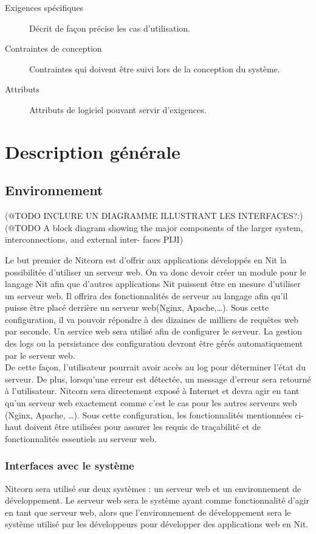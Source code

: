 \documentclass{scrreprt}
\begin{document}
\begin{description}
\item[Exigences spécifiques] Décrit de façon précise les cas d'utilisation.
\item[Contraintes de conception] Contraintes qui doivent être suivi lors de la conception du système.
\item[Attributs] Attributs de logiciel pouvant servir d'exigences. 
\end{description}
\chapter{Description générale}
\section{Environnement}
(@TODO INCLURE UN DIAGRAMME ILLUSTRANT LES INTERFACES?:)\\
(@TODO A block diagram showing the major components of the larger system, interconnections, and external inter-
faces PIJI)

Le but premier de Nitcorn est d'offrir aux applications développés en Nit la possibilitée
d'utiliser un serveur web. On va donc devoir créer un module pour le langage Nit afin que d'autres applications Nit puissent être en mesure d'utiliser un serveur web. Il offrira des fonctionnalités de serveur au langage afin qu'il puisse être placé derrière un serveur web(Nginx, Apache,\ldots). Sous cette configuration, il va pouvoir répondre à des dizaines de milliers de requêtes web par seconde. Un service web sera utilisé afin de configurer le serveur. La gestion des logs ou la persistance des configuration devront être gérés automatiquement par le serveur web.\\ De cette façon, l'utilisateur pourrait avoir accès au log pour déterminer l'état du serveur. De plus, lorsqu'une erreur est détectée, un message d'erreur sera retourné à l'utilisateur. Nitcorn sera directement exposé à Internet et devra agir en tant qu'un serveur web exactement comme c'est le cas pour les autres
serveurs web (Nginx, Apache, \ldots). Sous cette configuration, les
fonctionnalités mentionnées ci-haut doivent être utilisées pour assurer les requis de traçabilité
et de fonctionnalités essentiels au serveur web.

\subsection{Interfaces avec le système}
Nitcorn sera utilisé sur deux systèmes : un serveur web et un environnement de développement.
Le serveur web sera le système ayant comme fonctionnalité d'agir en tant que serveur web, alors
que l'environnement de développement sera le système utilisé par les développeurs
pour développer des applications web en Nit.
\end{document}
